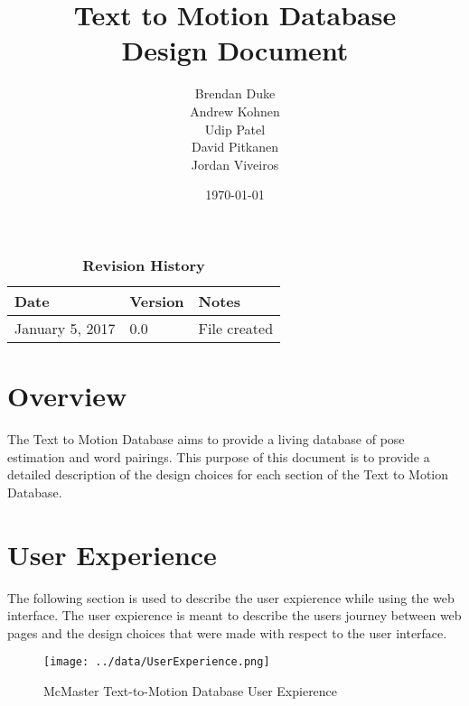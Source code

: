 \documentclass{scrreprt}
\begin{document}
\title{\bf Text to Motion Database\\[\baselineskip]\Large Design Document}
\author{Brendan Duke\\Andrew Kohnen\\Udip Patel\\David Pitkanen\\Jordan Viveiros}
\date{\today}
	
\maketitle

\tableofcontents


\begin{table}[bp]
\caption*{\bf Revision History}
\begin{tabularx}{\textwidth}{p{3.5cm}p{2cm}X}
\toprule {\bf Date} & {\bf Version} & {\bf Notes}\\
\midrule
January 5, 2017 & 0.0 & File created\\
\bottomrule
\end{tabularx}
\end{table}

\newpage


\chapter{Overview}
The Text to Motion Database aims to provide a living database of pose estimation and word pairings. This purpose of this document is to provide a detailed description of the design choices for each section of the Text to Motion Database. 

\chapter{User Experience}
The following section is used to describe the user expierence while using the web interface. The user expierence is meant to describe the users journey between web pages and the design choices that were made with respect to the user interface.

\begin{figure}[!ht]
        \caption{McMaster Text-to-Motion Database User Expierence}
        \label{userExp}
        \centering
        \texttt{[image: ../data/UserExperience.png]}
\end{figure}
\end{document}
